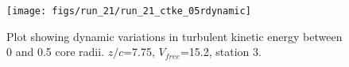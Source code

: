 \begin{figure}[H]
\centering
\texttt{[image: figs/run\_21/run\_21\_ctke\_05rdynamic]}
\caption{Plot showing dynamic variations in turbulent kinetic energy between 0 and 0.5 core radii. $z/c$=7.75, $V_{free}$=15.2, station 3.}
\label{fig:run_21_ctke_05rdynamic}
\end{figure}


